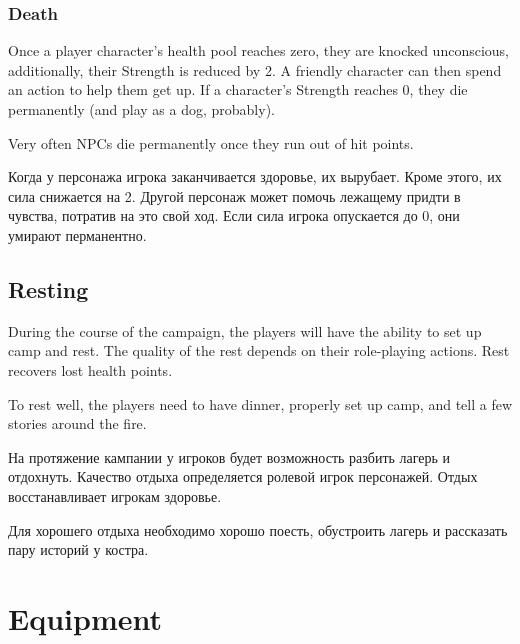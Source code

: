 \documentclass[a5paper,11pt]{book}
\begin{document}
\begin{multicols}{2}
\subsection{Death}
\begin{en}
Once a player character's health pool reaches zero, they are knocked unconscious, additionally, their Strength is reduced by 2. A friendly character can then spend an action to help them get up. If a character's Strength reaches 0, they die permanently (and play as a dog, probably).

Very often NPCs die permanently once they run out of hit points.
\end{en}

\begin{ru}
  Когда у персонажа игрока заканчивается здоровье, их вырубает. Кроме этого, их сила снижается на 2. Другой персонаж может помочь лежащему придти в чувства, потратив на это свой ход. Если сила игрока опускается до 0, они умирают перманентно.
\end{ru}

\section{Resting}
\begin{en}
During the course of the campaign, the players will have the ability to set up camp and rest. The quality of the rest depends on their role-playing actions. Rest recovers lost health points.

To rest well, the players need to have dinner, properly set up camp, and tell a few stories around the fire.
\end{en}

\begin{ru}
На протяжение кампании у игроков будет возможность разбить лагерь и отдохнуть. Качество отдыха определяется ролевой игрок персонажей. Отдых восстанавливает игрокам здоровье.

Для хорошего отдыха необходимо хорошо поесть, обустроить лагерь и рассказать пару историй у костра.
\end{ru}

\end{multicols}

\pagebreak
\chapter{Equipment}
\end{document}
